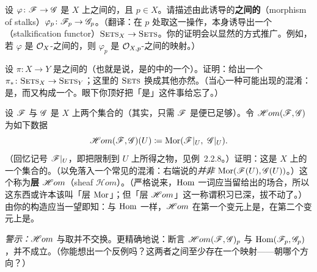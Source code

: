 \begin{exercise}[（预）层的态射诱导茎间的态射]\label{ex:morphisms-induce-stalk-maps}
设 $\varphi\colon\mathscr{F}\to\mathscr{G}$ 是 $X$ 上\trPresheaf{}之间的\trMorphism，且 $p\in X$。请描述由此诱导的\textbf{\trStalk{}之间的\trMorphism}（morphism of stalks）$\varphi_p\colon\mathscr{F}_p\to\mathscr{G}_p$。（翻译：在 $p$ 处取\trStalk{}这一操作，本身诱导出一个\textbf{\trStalkification\trFunctor}（stalkification functor）$\textsc{Sets}_{X}\to\textsc{Sets}$。你的证明会以显然的方式推广。例如，若 $\varphi$ 是 $\mathcal{O}_X$-\trModule{}之间的\trMorphism，则 $\varphi_p$ 是 $\mathcal{O}_{X,p}$-\trModule{}之间的映射。）
\end{exercise}

\begin{exercise}\label{ex:pushforward-induces-functor}
设 $\pi\colon X\to Y$ 是\trTopologicalSpace{}之间的\trContinuousMap{}（也就是说，是\trTopologicalSpace{}的\trCategory{}中的一个\trMorphism）。证明：\trPushforward{}给出一个\trFunctor{} $\pi_*\colon\textsc{Sets}_{X}\to\textsc{Sets}_{Y}$；这里的 $\textsc{Sets}$ 换成其他\trCategory{}亦然。（当心一种可能出现的混淆：\trPresheaf{}是\trFunctor，而\trPresheaf{}又构成一个\trCategory{}。眼下你顶好把「\trPresheaf{}是\trFunctor{}」这件事给忘了。）
\end{exercise}

\begin{exercise}\label{ex:sheaf-hom-definition}
设 $\mathscr{F}$ 与 $\mathscr{G}$ 是 $X$ 上两个集合的\trSheaf{}（其实，只需 $\mathscr{F}$ 是\trPresheaf{}便已足够）。令 $\mathscr{H}om(\mathscr{F},\mathscr{G})$ 为如下数据
\[
\scr{H}om(\scr{F},\scr{G})(U)\coloneqq\Mor(\scr{F}|_U,\ \scr{G}|_U).
\]
（回忆记号 $\mathscr{F}|_U$，即把\trSheaf{}限制到\trOpenSet{} $U$ 上所得之物，见\mbox{例~2.2.8}。）证明：这是 $X$ 上的一个集合的\trSheaf{}。（以免落入一个常见的混淆：右端说的\emph{并非} $\operatorname{Mor}(\mathscr{F}(U),\mathscr{G}(U))$。）这个\trSheaf{}称为\textbf{层 $\mathscr{H}om$}（sheaf $\mathscr{H}om$）。（严格说来，$\operatorname{Hom}$ 一词应当留给出\trAdditiveCategory{}的场合，所以这东西或许本该叫「层 $\operatorname{Mor}$」；但「层 $\mathscr{H}om$」这一称谓积习已深，拔不动了。）由你的构造应当一望即知：与 $\operatorname{Hom}$ 一样，$\mathscr{H}om$ 在第一个变元上是\trContravariantFunctor，在第二个变元上是\trCovariantFunctor。

\emph{警示：}$\mathscr{H}om$ 与取\trStalk{}并不交换。更精确地说：断言 $\mathscr{H}om(\mathscr{F},\mathscr{G})_p$ 与 $\operatorname{Hom}(\mathscr{F}_p,\mathscr{G}_p)$ \trIsomorphic，并不成立。（你能想出一个反例吗？这两者之间至少存在一个映射——朝哪个方向？）
\end{exercise}

